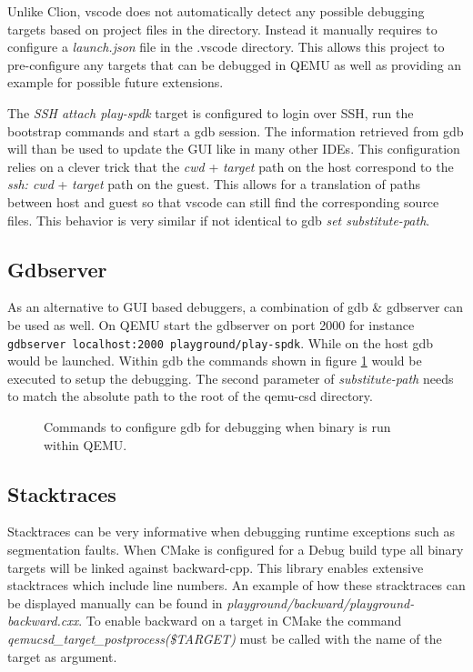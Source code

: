 \documentclass[conference]{IEEEtran}
\newcommand\bashstyle{
	\lstset{
		language=Bash,
		basicstyle=\ttm,
		showstringspaces=false,
		tabsize=2,
		aboveskip=0.2cm,
		belowskip=0.2cm,
		prebreak=\textbackslash,
		extendedchars=true,
		mathescape=false,
		linewidth=8.85cm,
		breaklines=true
	}
}
\newcommand\bashinline[1]{{\bashstyle\lstinline!#1!}}
\newcommand\bashexternal[2][]{{\bashstyle}}
\begin{document}
Unlike Clion, vscode does not automatically detect any possible debugging
targets based on project files in the directory. Instead it manually requires to
configure a \textit{launch.json} file in the .vscode directory. This allows this
project to pre-configure any targets that can be debugged in QEMU as well as
providing an example for possible future extensions.

The \textit{SSH attach play-spdk} target is configured to login over SSH, run
the bootstrap commands and start a gdb session. The information retrieved from
gdb will than be used to update the GUI like in many other IDEs. This
configuration relies on a clever trick that the \textit{cwd} + \textit{target}
path on the host correspond to the \textit{ssh: cwd} + \textit{target} path on
the guest. This allows for a translation of paths between host and guest so
that vscode can  still find the corresponding source files. This behavior is
very similar if not identical to gdb \textit{set substitute-path}.

\subsection{Gdbserver}

As an alternative to GUI based debuggers, a combination of gdb \& gdbserver can
be used as well. On QEMU start the gdbserver on port 2000 for
instance\bashinline{gdbserver localhost:2000 playground/play-spdk}. While on the
host gdb would be launched. Within gdb the commands shown in
figure \ref{fig:gdb-qemu} would be executed to setup the debugging. The second
parameter of \textit{substitute-path} needs to match the absolute path to the
root of the qemu-csd directory.

\begin{center}
	\begin{figure}[H]
		\bashexternal{resources/bash/gdb-qemu.sh}
		\captionsetup{justification=centering}
		\caption{Commands to configure gdb for debugging when binary is run
			within QEMU.}
		\label{fig:gdb-qemu}
	\end{figure}
\end{center}

\subsection{Stacktraces}

Stacktraces can be very informative when debugging runtime exceptions such as
segmentation faults. When CMake is configured for a Debug build type all binary
targets will be linked against backward-cpp. This library enables extensive
stacktraces which include line numbers. An example of how these stracktraces can
be displayed manually can be found in
\textit{playground/backward/playground-backward.cxx}. To enable backward on a
target in CMake the command \textit{qemucsd\_target\_postprocess(\$TARGET)} must
be  called with the name of the target as argument.
\end{document}

